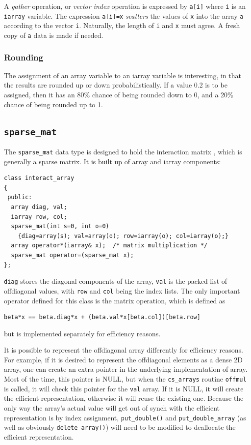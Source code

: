 A {\em gather} operation, or {\em vector index} operation is expressed
by \verb|a[i]| where {\tt i} is an {\tt iarray} variable. The
expression \verb|a[i]=x| {\em scatters} the values of {\tt x} into the
array {\tt a} according to the vector {\tt i}. Naturally, the length
of {\tt i} and {\tt x} must agree. A fresh copy of {\tt a} data is
made if needed.


\subsubsection{Rounding}

The assignment of an array variable to an iarray variable is
interesting, in that the results are rounded up or down
probabilistically. If a value 0.2 is to be assigned, then it has an
80\% chance of being rounded down to 0, and a 20\% chance of being
rounded up to 1.

\subsection{{\tt sparse\_mat}}\label{interact_array}

The {\tt sparse\_mat} data type is designed to hold the
interaction matrix \bbeta, which is generally a sparse matrix. It is
built up of array and iarray components:

\begin{verbatim}
class interact_array
{
 public:
  array diag, val;
  iarray row, col;
  sparse_mat(int s=0, int o=0)
    {diag=array(s); val=array(o); row=iarray(o); col=iarray(o);}
  array operator*(iarray& x);  /* matrix multiplication */
  sparse_mat operator=(sparse_mat x);
};
\end{verbatim}

{\tt diag} stores the diagonal components of the array, {\tt val} is
the packed list of offdiagonal values, with {\tt row} and {\tt col}
being the index lists. The only important operator defined for this
class is the matrix operation, which is defined as
\begin{verbatim}
beta*x == beta.diag*x + (beta.val*x[beta.col])[beta.row]
\end{verbatim}
but is implemented separately for efficiency reasons.

It is possible to represent the offdiagonal array differently  for
efficiency reasons. For example, if it is desired to represent the
offdiagonal elements as a dense 2D array, one can create an extra
pointer in the underlying implementation of array. Most of the time,
this pointer is NULL, but when the \verb|cs_arrays| routine
\verb|offmul| is called, it will check this pointer for the {\tt val}
array. If it is NULL, it will create the efficient
representation, otherwise it will reuse the existing one. Because the
only way the array's actual value will get out of synch with the
efficient representation is by index assignment, \verb|put_double()|
and \verb|put_double_array| (as well as obviously
\verb|delete_array()|) will need to be modified to deallocate the
efficient representation.

